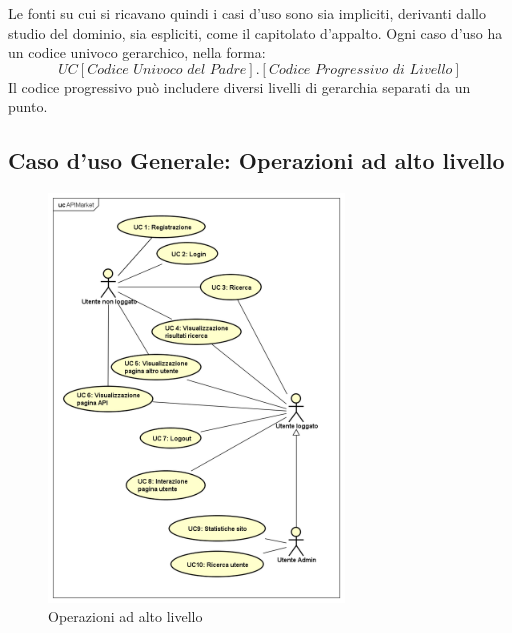 \documentclass[12pt,a4paper,titlepage]{article}
\begin{document}
	Le fonti su cui si ricavano quindi i casi d'uso sono sia impliciti, derivanti dallo studio del dominio, sia espliciti, come il capitolato d'appalto.
	Ogni caso d'uso ha un codice univoco gerarchico, nella forma: 
	\[UC[\textit{Codice Univoco del Padre}].[\textit{Codice Progressivo di Livello}]\] 
	Il codice progressivo può includere diversi livelli di gerarchia separati da un punto.
	\clearpage
	\subsection{Caso d'uso Generale: Operazioni ad alto livello}
	\begin{figure}[ht]
		\centering
		\includegraphics[width=0.7\textwidth]{UseCase/APIMarket}
		\caption{Operazioni ad alto livello}
	\end{figure}
\end{document}
